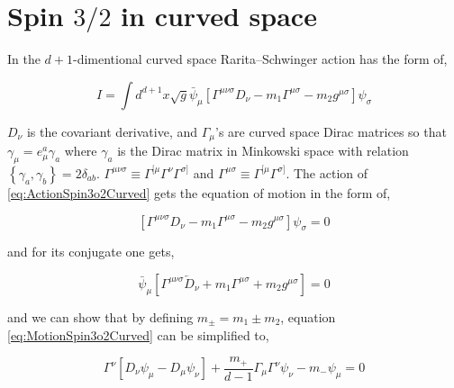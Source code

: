 \section{Spin $3/2$ in curved space}

In the $d+1$-dimentional curved space Rarita–Schwinger action has the form of,

\begin{equation} \label{eq:ActionSpin3o2Curved}
   I = \int d^{d+1}x \sqrt{g} \bar{\psi}_{\mu} \left[\Gamma^{\mu\nu\sigma} D_{\nu} - m_1\Gamma^{\mu\sigma} - m_2 g^{\mu\sigma} \right] \psi_{\sigma}
\end{equation}

$D_{\nu}$ is the covariant derivative, and $\Gamma_{\mu}$'s are curved space Dirac matrices so that $\gamma_{\mu} = e^{a}_{\mu}\gamma_{a}$ where $\gamma_{a}$ is the Dirac matrix in Minkowski space with relation $\left\{\gamma_{a},\gamma_{b}\right\}=2\delta_{ab}$. $\Gamma^{\mu\nu\sigma} \equiv \Gamma^{[\mu}\Gamma^{\nu}\Gamma^{\sigma]}$ and $\Gamma^{\mu\sigma} \equiv \Gamma^{[\mu}\Gamma^{\sigma]}$. The action of \ref{eq:ActionSpin3o2Curved} gets the equation of motion in the form of,

\begin{equation} \label{eq:MotionSpin3o2Curved}
   \left[\Gamma^{\mu\nu\sigma} D_{\nu} - m_1\Gamma^{\mu\sigma} - m_2 g^{\mu\sigma} \right] \psi_{\sigma} = 0
\end{equation}

and for its conjugate one gets,

\begin{equation}
   \bar{\psi}_{\mu} \left[\Gamma^{\mu\nu\sigma} \overleftarrow{D}_{\nu} + m_1\Gamma^{\mu\sigma} + m_2 g^{\mu\sigma} \right] = 0
\end{equation}

and we can show that by defining $m_{\pm} = m_1 \pm m_2$, equation \ref{eq:MotionSpin3o2Curved} can be simplified to,

\begin{equation}
   \Gamma^{\nu}\left[D_{\nu}\psi_{\mu} - D_{\mu}\psi_{\nu}\right] + \frac{m_{+}}{d-1}\Gamma_{\mu}\Gamma^{\nu}\psi_{\nu} - m_{-}\psi_{\mu} = 0
\end{equation}

